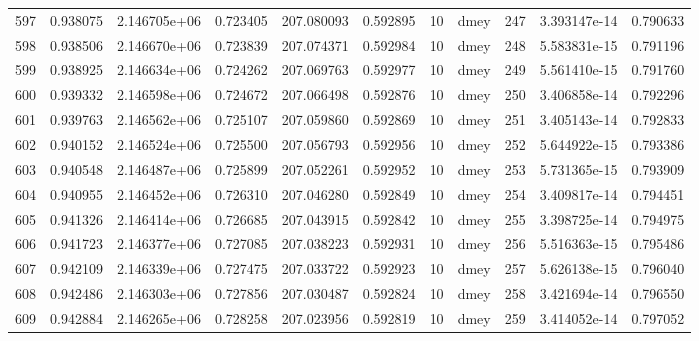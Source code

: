 \begin{tabular}{lrrrrrrlrrr}
597  &    0.938075 &        2.146705e+06 &  0.723405 &              207.080093 &    0.592895 &      10 &         dmey &    247 &   3.393147e-14 &      0.790633 \\
598  &    0.938506 &        2.146670e+06 &  0.723839 &              207.074371 &    0.592984 &      10 &         dmey &    248 &   5.583831e-15 &      0.791196 \\
599  &    0.938925 &        2.146634e+06 &  0.724262 &              207.069763 &    0.592977 &      10 &         dmey &    249 &   5.561410e-15 &      0.791760 \\
600  &    0.939332 &        2.146598e+06 &  0.724672 &              207.066498 &    0.592876 &      10 &         dmey &    250 &   3.406858e-14 &      0.792296 \\
601  &    0.939763 &        2.146562e+06 &  0.725107 &              207.059860 &    0.592869 &      10 &         dmey &    251 &   3.405143e-14 &      0.792833 \\
602  &    0.940152 &        2.146524e+06 &  0.725500 &              207.056793 &    0.592956 &      10 &         dmey &    252 &   5.644922e-15 &      0.793386 \\
603  &    0.940548 &        2.146487e+06 &  0.725899 &              207.052261 &    0.592952 &      10 &         dmey &    253 &   5.731365e-15 &      0.793909 \\
604  &    0.940955 &        2.146452e+06 &  0.726310 &              207.046280 &    0.592849 &      10 &         dmey &    254 &   3.409817e-14 &      0.794451 \\
605  &    0.941326 &        2.146414e+06 &  0.726685 &              207.043915 &    0.592842 &      10 &         dmey &    255 &   3.398725e-14 &      0.794975 \\
606  &    0.941723 &        2.146377e+06 &  0.727085 &              207.038223 &    0.592931 &      10 &         dmey &    256 &   5.516363e-15 &      0.795486 \\
607  &    0.942109 &        2.146339e+06 &  0.727475 &              207.033722 &    0.592923 &      10 &         dmey &    257 &   5.626138e-15 &      0.796040 \\
608  &    0.942486 &        2.146303e+06 &  0.727856 &              207.030487 &    0.592824 &      10 &         dmey &    258 &   3.421694e-14 &      0.796550 \\
609  &    0.942884 &        2.146265e+06 &  0.728258 &              207.023956 &    0.592819 &      10 &         dmey &    259 &   3.414052e-14 &      0.797052 \\

\end{tabular}
